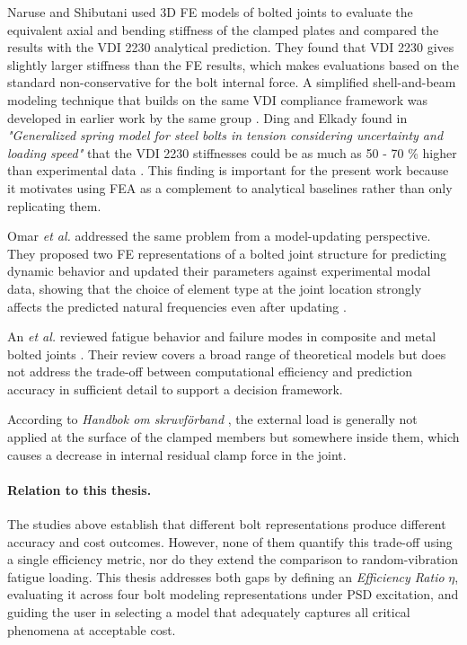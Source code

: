 \documentclass[a4paper,twoside]{bth}
\begin{document}
Naruse and Shibutani \cite{09} used 3D \ac{FE} models of bolted joints to evaluate the equivalent axial and bending stiffness of the clamped plates and compared the results with the VDI 2230 analytical prediction. They found that VDI 2230 gives slightly larger stiffness than the \ac{FE} results, which makes evaluations based on the standard non-conservative for the bolt internal force. A simplified shell-and-beam modeling technique that builds on the same VDI compliance framework was developed in earlier work by the same group \cite{07}. Ding and Elkady found in \textit{"Generalized spring model for steel bolts in tension considering uncertainty and loading speed"} that the VDI 2230 stiffnesses could be as much as 50 - 70 \% higher than experimental data \cite{ding_generalized_2025}. This finding is important for the present work because it motivates using \ac{FEA} as a complement to analytical baselines rather than only replicating them.

Omar \textit{et al.} addressed the same problem from a model-updating perspective. They proposed two \ac{FE} representations of a bolted joint structure for predicting dynamic behavior and updated their parameters against experimental modal data, showing that the choice of element type at the joint location strongly affects the predicted natural frequencies even after updating \cite{noauthor_pdf_2025}.

An \textit{et al.} reviewed fatigue behavior and failure modes in composite and metal bolted joints \cite{08}. Their review covers a broad range of theoretical models but does not address the trade-off between computational efficiency and prediction accuracy in sufficient detail to support a decision framework.

According to \textit{Handbok om skruvförband} \cite{Colly}, the external load is generally not applied at the surface of the clamped members but somewhere inside them, which causes a decrease in internal residual clamp force in the joint.

\paragraph{Relation to this thesis.}
The studies above establish that different bolt representations produce different accuracy and cost outcomes. However, none of them quantify this trade-off using a single efficiency metric, nor do they extend the comparison to random-vibration fatigue loading. This thesis addresses both gaps by defining an \textit{Efficiency Ratio} $\eta$, evaluating it across four bolt modeling representations under \ac{PSD} excitation, and guiding the user in selecting a model that adequately captures all critical phenomena at acceptable cost.
\end{document}
